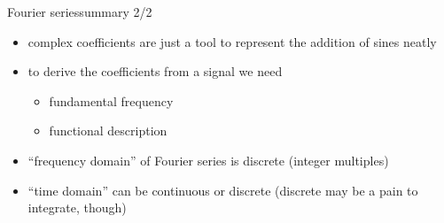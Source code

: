     \begin{frame}{Fourier series}{summary 2/2}
        \begin{itemize}
            \item   complex coefficients are just a tool to represent the addition of sines neatly
            \smallskip
            \item<2->   to derive the coefficients from a signal we need
                \begin{itemize}
                    \item   fundamental frequency
                    \item   functional description
                \end{itemize}
            \smallskip
            \item<3->   ``frequency domain'' of Fourier series is discrete (integer multiples)
            \smallskip
            \item<4->   ``time domain'' can be continuous or discrete (discrete may be a pain to integrate, though)
        \end{itemize}
    \end{frame}
    



